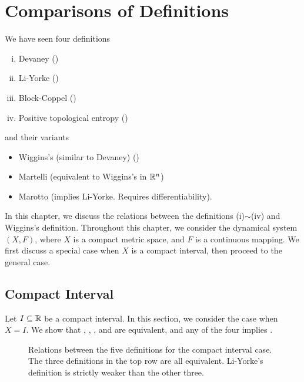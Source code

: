 \documentclass[10pt,twoside,draft]{book}
\begin{document}
\label{chap:comparison}
\chapter{Comparisons of Definitions}
We have seen four definitions 
\begin{enumerate}[(i)]
  \item Devaney (\dev)
  \item Li-Yorke (\liy)
  \item Block-Coppel (\blcp)
  \item Positive topological entropy (\akm)
\end{enumerate}
and their variants
\begin{itemize}
  \item Wiggins's (similar to Devaney) (\wig)
  \item Martelli (equivalent to Wiggins's in $\mathbb{R}^n$)
  \item Marotto (implies Li-Yorke. Requires differentiability).
\end{itemize}
In this chapter, we discuss the relations between the definitions (i)$\sim$(iv) and Wiggins's definition.
Throughout this chapter, we consider the dynamical system $(X,F)$, where $X$ is a compact metric space, and $F$ is a continuous mapping.
We first discuss a special case when $X$ is a compact interval, then proceed to the general case.

\section{Compact Interval}
Let $I \subseteq \mathbb{R}$ be a compact interval.
In this section, we consider the case when $X = I$.
We show that \dev, \wig, \blcp, and \akm are equivalent, and any of the four implies \liy.
\begin{figure}[ht]
  \centering
  \label{fig:chaos-interval}
  \caption{
    Relations between the five definitions for the compact interval case.
    The three definitions in the top row are all equivalent.
    Li-Yorke's definition is strictly weaker than the other three.
  }
\end{figure}
\end{document}
